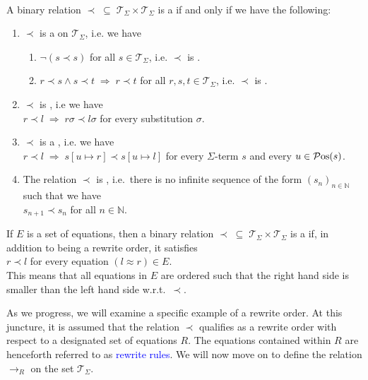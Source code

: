 \begin{Definition} \hspace*{\fill} \\
  A binary relation $\prec \;\subseteq\; \mathcal{T}_\Sigma \times \mathcal{T}_\Sigma$ is a
   if and only if we have the following:
  \begin{enumerate}
  \item $\prec$ is a  on $\mathcal{T}_\Sigma$, i.e. we have
        \begin{enumerate}
        \item $\neg (s \prec s)$ \hspace*{2.6cm} for all $s \in \mathcal{T}_\Sigma$, i.e. $\prec$ is .
        \item $r \prec s \wedge s \prec t \;\Rightarrow\; r \prec t$ \quad for all $r,s,t \in \mathcal{T}_\Sigma$,
              i.e. $\prec$ is . 
        \end{enumerate}
    
  \item $\prec$ is , i.e we have
        \\[0.2cm]
        \hspace*{1.3cm}
        $r \prec l \;\Rightarrow\; r\sigma \prec l\sigma$ \quad for every substitution $\sigma$.
  \item $\prec$ is a , i.e. we have
        \\[0.2cm]
        \hspace*{1.3cm}
        $r \prec l \;\Rightarrow\; s[u \mapsto r] \prec s[u \mapsto l]$ for every $\Sigma$-term $s$ and every
        $u \in\mathcal{P}\mathrm{os}(s)  $.
  \item The relation $\prec$ is , i.e.~there is no infinite sequence of the form
        $(s_n)_{n\in\mathbb{N}}$ such that we have
        \\[0.2cm]
        \hspace*{1.3cm}
        $s_{n+1} \prec s_n$ \quad for all $n \in \mathbb{N}$. 
  \end{enumerate}
  If $E$ is a set of equations, then a binary relation $\prec \;\subseteq\; \mathcal{T}_\Sigma \times \mathcal{T}_\Sigma$
  is a  if, in addition to being a rewrite order, it satisfies
  \\[0.2cm]
  \hspace*{1.3cm}
  $r \prec l$ \quad for every equation $(l \approx r) \in E$.
  \\[0.2cm]    
  This means that all equations in $E$ are ordered such that the right hand side is smaller than the left
  hand side w.r.t.~$\prec$.    \eod
\end{Definition}
As we progress, we will examine a specific example of a rewrite order. At this juncture, it is assumed that the
relation $\prec$ qualifies as a rewrite order with respect to a designated set of equations $R$. The equations
contained within $R$ are henceforth referred to as \textcolor{blue}{rewrite rules}. We will now move on to
define the relation $\rightarrow_R$ on the set $\mathcal{T}_\Sigma$. 

